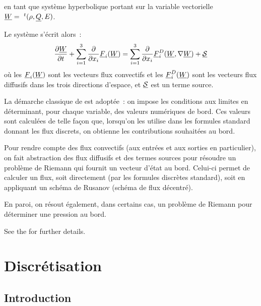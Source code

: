 en tant que syst\`eme hyperbolique portant sur la variable vectorielle
$\underline{W}=\ ^t(\rho,\underline{Q},E)$.

Le syst\`eme s'\'ecrit alors~:
\begin{equation}\label{Cfbl_Cfxtcl_eq_hyperbolique_cfxtcl}
\displaystyle\frac{\partial \underline{W}}{\partial t}
+ \displaystyle\sum\limits_{i=1}^3
\frac{\partial}{\partial x_i}\underline{F}_i(\underline{W})
= \displaystyle\sum\limits_{i=1}^3
\frac{\partial}{\partial x_i}\underline{F}_i^D(\underline{W},\nabla \underline{W})
+ \underline{\mathcal{S}}
\end{equation}
o\`u les $\underline{F}_i(\underline{W})$ sont les vecteurs flux convectifs
et les $\underline{F}_i^D(\underline{W})$ sont les vecteurs flux diffusifs
dans les trois directions d'espace,
et $\underline{\mathcal{S}}$ est un terme source.

La d\'emarche classique de \CS est adopt\'ee~: on impose les conditions
aux limites en d\'eterminant, pour chaque variable, des valeurs num\'eriques
de bord. Ces valeurs sont calcul\'ees de telle fa\c con que, lorsqu'on
les utilise dans les formules standard donnant les flux discrets, on obtienne
les contributions souhait\'ees au bord.

Pour rendre compte des flux convectifs (aux entr\'ees et aux sorties en particulier),
on fait abstraction des flux diffusifs et des termes
sources pour r\'esoudre un probl\`eme de Riemann qui
fournit un vecteur d'\'etat au bord. Celui-ci permet de calculer un flux,
soit directement (par les formules discr\`etes standard),
soit en appliquant un sch\'ema de Rusanov (sch\'ema de flux d\'ecentr\'e).

En paroi, on r\'esout  \'egalement, dans certains cas, un probl\`eme de
Riemann pour d\'eterminer une pression au bord.

See the  for further details.

\section*{Discr\'etisation}

\subsection*{Introduction}

